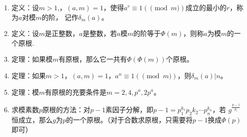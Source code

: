 \begin{enumerate}\setlength{\itemsep}{-\itemsep}
	\item 定义：设$m > 1$,，$(a, m) = 1$，使得$a^r \equiv 1(\pmod m)$成立的最小的$r$，称为$a$对模$m$的阶，
	记作$\delta_m(a)$。
	\item 定义：设$m$是正整数，$a$是整数，若$a$模$m$的阶等于$\Phi(m)$，则称$a$为模$m$的一个原根.
	\item 定理：如果模$m$有原根，那么它一共有$\Phi(\Phi(m))$个原根。
	\item 定理：如果$m > 1$，$(a, m) = 1$，$a^n \equiv 1(\pmod m)$，则$\delta_m(a)|n$。
	\item 定理：模$m$有原根的充要条件是$m = 2, 4, p^a, 2p^a$。
	\item 求模素数$p$原根的方法：对$p - 1$素因子分解，即$p - 1 = p_1^{k_1}p_2{k_2}\cdots p_n^{k_n}$，若
	$g^\frac{p - 1}{p_i}$恒成立，那么$g$为$p$的一个原根。（对于合数求原根，只需要将$p - 1$换成$\Phi(p)$即可）
\end{enumerate}
